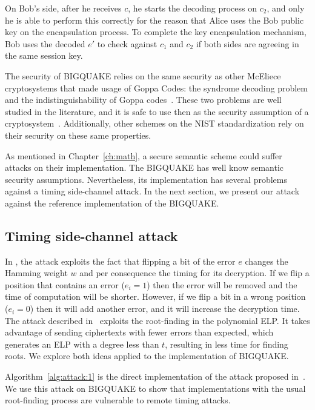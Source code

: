 On Bob's side, after he receives $c$, he starts the decoding process on $c_2$, and only he is able to perform this correctly for the reason that Alice uses the Bob public key on the encapsulation process. To complete the key encapsulation mechanism, Bob uses the decoded $e'$ to check against $c_1$ and $c_2$ if both sides are agreeing in the same session key.

The security of BIGQUAKE relies on the same security as other McEliece cryptosystems that made usage of Goppa Codes: the syndrome decoding problem and the indistinguishability of Goppa codes~\cite{bardet2017big}. These two problems are well studied in the literature, and it is safe to use then as the security assumption of a cryptosystem~\cite{bernstein2008attacking, faugere2013distinguisher}. Additionally, other schemes on the NIST standardization rely on their security on these same properties\cite{bernstein2017classic}.

As mentioned in Chapter~\ref{ch:math}, a  secure semantic scheme could suffer attacks on their implementation. The BIGQUAKE has well know semantic security assumptions. Nevertheless, its implementation has several problems against a timing side-channel attack. In the next section, we present our attack against the reference implementation of the BIGQUAKE. 

\subsection{Timing side-channel attack}
In \cite{shoufan2009timing}, the attack exploits the fact that flipping a bit of the error $e$ changes the Hamming weight $w$ and per consequence the timing for its decryption. If we flip a position that contains an error ($e_i = 1$) then the error will be removed and the time of computation will be shorter. However, if we flip a bit in a wrong position ($e_i = 0$) then it will add another error, and it will increase the decryption time. The attack described in~\cite{bucerzan2017improved} exploits the  root-finding in the polynomial ELP. It takes advantage of sending ciphertexts with fewer errors than expected, which generates an ELP with a degree less than $t$, resulting in less time for finding roots. We explore both ideas applied to the implementation of BIGQUAKE.

Algorithm~\ref{alg:attack:1} is the direct implementation of the attack proposed in~\cite{shoufan2009timing}. We use this attack on BIGQUAKE to show that implementations with the usual  root-finding process are vulnerable to remote timing attacks.

